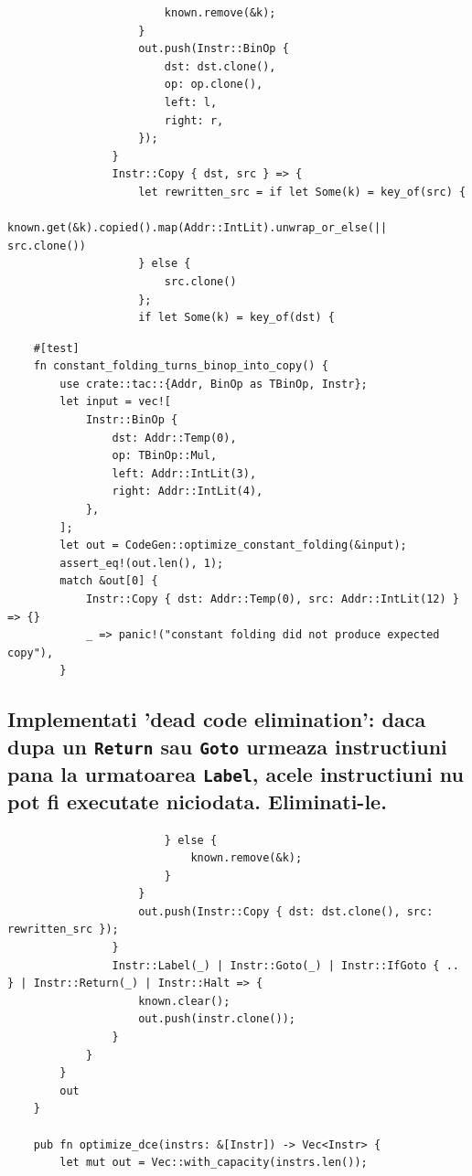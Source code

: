 \documentclass[11pt]{article}
\begin{document}
\begin{verbatim}
                        known.remove(&k);
                    }
                    out.push(Instr::BinOp {
                        dst: dst.clone(),
                        op: op.clone(),
                        left: l,
                        right: r,
                    });
                }
                Instr::Copy { dst, src } => {
                    let rewritten_src = if let Some(k) = key_of(src) {
                        known.get(&k).copied().map(Addr::IntLit).unwrap_or_else(|| src.clone())
                    } else {
                        src.clone()
                    };
                    if let Some(k) = key_of(dst) {
\end{verbatim}
\begin{verbatim}
    #[test]
    fn constant_folding_turns_binop_into_copy() {
        use crate::tac::{Addr, BinOp as TBinOp, Instr};
        let input = vec![
            Instr::BinOp {
                dst: Addr::Temp(0),
                op: TBinOp::Mul,
                left: Addr::IntLit(3),
                right: Addr::IntLit(4),
            },
        ];
        let out = CodeGen::optimize_constant_folding(&input);
        assert_eq!(out.len(), 1);
        match &out[0] {
            Instr::Copy { dst: Addr::Temp(0), src: Addr::IntLit(12) } => {}
            _ => panic!("constant folding did not produce expected copy"),
        }
\end{verbatim}
\subsection{Implementati 'dead code elimination': daca dupa un \texttt{Return} sau \texttt{Goto} urmeaza instructiuni pana la urmatoarea \texttt{Label}, acele instructiuni nu pot fi executate niciodata. Eliminati-le.}
\label{sec:orgb14925a}
\begin{verbatim}
                        } else {
                            known.remove(&k);
                        }
                    }
                    out.push(Instr::Copy { dst: dst.clone(), src: rewritten_src });
                }
                Instr::Label(_) | Instr::Goto(_) | Instr::IfGoto { .. } | Instr::Return(_) | Instr::Halt => {
                    known.clear();
                    out.push(instr.clone());
                }
            }
        }
        out
    }

    pub fn optimize_dce(instrs: &[Instr]) -> Vec<Instr> {
        let mut out = Vec::with_capacity(instrs.len());
\end{verbatim}
\end{document}
